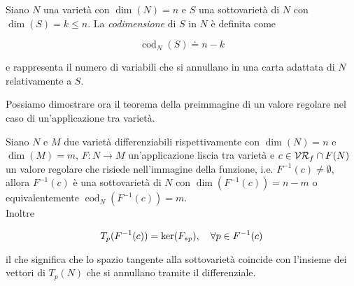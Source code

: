 \begin{definition}
	Siano $ N $ una varietà con $ \dim(N)=n $ e $ S $ una sottovarietà di $ N $ con $ \dim(S)=k \leqslant n $. La \textit{codimensione} di $ S $ in $ N $ è definita come
	
	\begin{equation}
		\operatorname{cod}_{N}(S) \doteq n-k
	\end{equation}

	e rappresenta il numero di variabili che si annullano in una carta adattata di $ N $ relativamente a $ S $.
\end{definition}

Possiamo dimostrare ora il teorema della preimmagine di un valore regolare nel caso di un'applicazione tra varietà.

\begin{theorem}\label{thm:preimg}
	Siano $ N $ e $ M $ due varietà differenziabili rispettivamente con $ \dim(N)=n $ e $ \dim(M)=m $, $ F : N \to M $ un'applicazione liscia tra varietà e $ c \in \mathcal{VR}_{f} \cap F(N) $ un valore regolare che risiede nell'immagine della funzione, i.e. $ F^{-1}(c) \neq \emptyset $, allora $ F^{-1}(c) $ è una sottovarietà di $ N $ con $ \dim(F^{-1}(c)) = n-m $ o equivalentemente $ \operatorname{cod}_{N}(F^{-1}(c)) = m $. \\
	Inoltre
	
	\begin{equation}
		T_{p}(F^{-1}(c)) = \ker(F_{*p}) \qcomma \forall p \in F^{-1}(c)
	\end{equation} 

	il che significa che lo spazio tangente alla sottovarietà coincide con l'insieme dei vettori di $ T_{p}(N) $ che si annullano tramite il differenziale.
\end{theorem}

